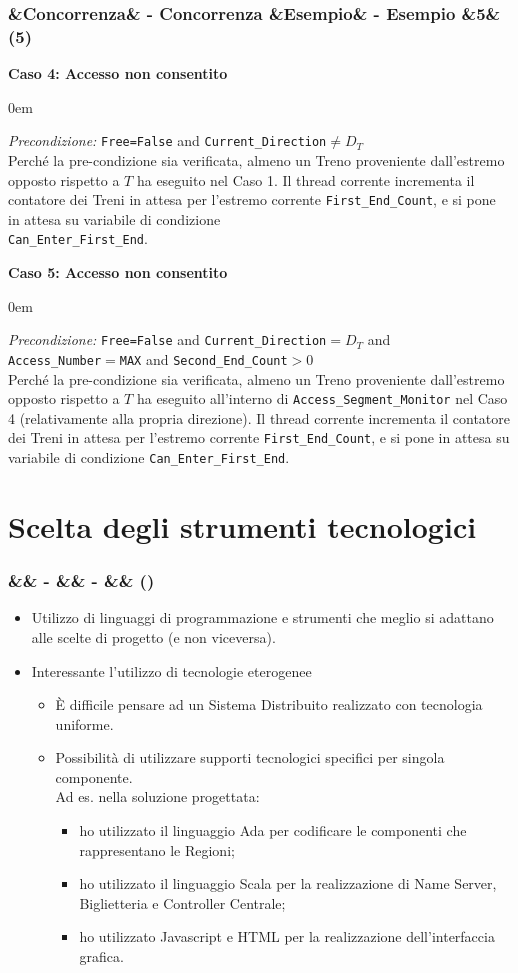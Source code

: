 \documentclass[slidestop,compress,blackandwhite]{beamer}
\newcommand{\ttt}[1]{\texttt{#1}}
\newcommand{\ii}[1]{\textit{#1}}
\newcommand{\describe}[2]{
	\textbf{#1}\\
	\begin{addmargin}[2em]{0em}
		#2
	\end{addmargin}
}
\newcommand{\newtitle}[4]{
	#1 
	\ifx&#2&%
	\else
  		\large- #2
	\fi
	\ifx&#3&%
	\else
  		\normalsize- #3
	\fi
	\ifx&#4&%
	\else
  		\normalsize (#4)
	\fi
}
\newcommand{\newframe}[5]{
	\begin{frame}
		\frametitle{\newtitle{#1}{#2}{#3}{#4}}
		#5
	\end{frame}
}
\newcommand{\myitemize}[1]{
	\begin{itemize}\itemsep4pt
	#1
	\end{itemize}
}
\begin{document}
	
	\newframe{}{Concorrenza}{Esempio}{5}{
		
		\describe{\footnotesize Caso 4: Accesso non consentito}{
			\footnotesize
			\justifying
			\ii{Precondizione:} \ttt{Free=False} and \ttt{Current\_Direction}$\ne D_T$\\
			Perché la pre-condizione sia verificata, almeno un Treno proveniente dall'estremo opposto rispetto a $T$ ha eseguito nel Caso 1. Il thread corrente incrementa il contatore dei Treni in attesa per l'estremo corrente \ttt{First\_End\_Count}, e si pone in attesa su variabile di condizione \\\ttt{Can\_Enter\_First\_End}. 
			
		}
		\describe{\footnotesize Caso 5: Accesso non consentito}{
			\footnotesize
			\justifying
			\ii{Precondizione:} \ttt{Free=False} and \ttt{Current\_Direction}$= D_T$ and \\\ttt{Access\_Number}$=$\ttt{MAX} and \ttt{Second\_End\_Count}$>0$\\
			Perché la pre-condizione sia verificata, almeno un Treno proveniente dall'estremo opposto rispetto a $T$ ha eseguito all'interno di \ttt{Access\_Segment\_Monitor} nel Caso 4 (relativamente alla propria direzione). Il thread corrente incrementa il contatore dei Treni in attesa per l'estremo corrente \ttt{First\_End\_Count}, e si pone in attesa su variabile di condizione \ttt{Can\_Enter\_First\_End}. 
			
		}
	}
	
\section{Scelta degli strumenti tecnologici}\label{tec}
	
	\newframe{}{}{}{}{
		\myitemize {
			\item Utilizzo di linguaggi di programmazione e strumenti che meglio si adattano alle scelte di progetto (e non viceversa).
			\item Interessante l'utilizzo di tecnologie eterogenee
				\myitemize {
					\item \`E difficile pensare ad un Sistema Distribuito realizzato con tecnologia uniforme.
					\item Possibilità di utilizzare supporti tecnologici specifici per singola componente.\\Ad es. nella soluzione progettata:
					
						\myitemize {
							\item ho utilizzato il linguaggio Ada per codificare le componenti che rappresentano le Regioni;
							\item ho utilizzato il linguaggio Scala per la realizzazione di Name Server, Biglietteria e Controller Centrale;
							\item ho utilizzato Javascript e HTML per la realizzazione dell'interfaccia grafica.
						}
				}
		}
	}
\end{document}
